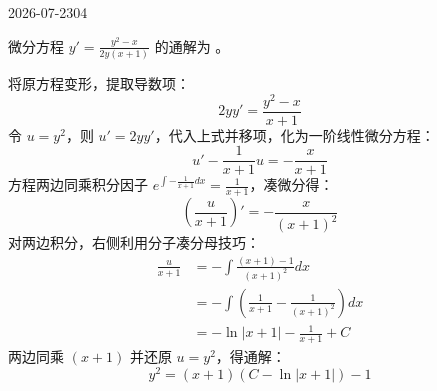 \begin{mistake}{2026-07-23}{04}

\begin{problemcontent}
微分方程 \(y' = \frac{y^2 - x}{2y(x+1)}\) 的通解为 \underline{\hspace{2cm}}。
\end{problemcontent}

\begin{solutioncontent}
将原方程变形，提取导数项：
\[2y y' = \frac{y^2 - x}{x+1}\]
令 \(u = y^2\)，则 \(u' = 2y y'\)，代入上式并移项，化为一阶线性微分方程：
\[u' - \frac{1}{x+1} u = -\frac{x}{x+1}\]
方程两边同乘积分因子 \(e^{\int -\frac{1}{x+1} dx} = \frac{1}{x+1}\)，凑微分得：
\[\left( \frac{u}{x+1} \right)' = -\frac{x}{(x+1)^2}\]
对两边积分，右侧利用分子凑分母技巧：
\[
\begin{aligned}
\frac{u}{x+1} &= -\int \frac{(x+1) - 1}{(x+1)^2} dx \\
&= -\int \left( \frac{1}{x+1} - \frac{1}{(x+1)^2} \right) dx \\
&= -\ln|x+1| - \frac{1}{x+1} + C
\end{aligned}
\]
两边同乘 \((x+1)\) 并还原 \(u = y^2\)，得通解：
\[y^2 = (x+1)(C - \ln|x+1|) - 1\]
\end{solutioncontent}


\end{mistake}
